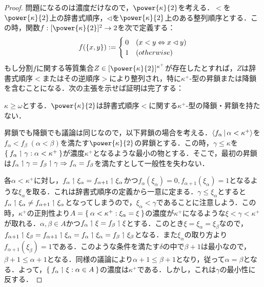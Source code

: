 \documentclass[a4paper]{bxjsarticle}
\begin{document}
\begin{proof}
 問題になるのは濃度だけなので，$\power{\kappa}{2}$を考える．$<$を$\power{\kappa}{2}$上の辞書式順序，$\lhd$を$\power{\kappa}{2}$上のある整列順序とする．この時，関数$f : [\power{\kappa}{2}]^2 \rightarrow 2$を次で定義する：
 \[
  f(\{x, y\}) \mathrel{:=} \begin{cases}
		      0 & (x < y \Leftrightarrow x \lhd y)\\
		      1 & (otherwise)
		     \end{cases}
 \]
 もし分割$f$に関する等質集合$Z \in [\power{\kappa}{2}]^{\kappa^+}$が存在したとすれば，$Z$は辞書式順序$<$またはその逆順序$>$により整列され，特に$\kappa^+$-型の昇鎖または降鎖を含むことになる．次の主張を示せば証明は完了する：

\begin{claim}
 $\kappa \geq \omega$とする．$\power{\kappa}{2}$は辞書式順序$<$に関する$\kappa^+$-型の降鎖・昇鎖を持たない．
\end{claim}
昇鎖でも降鎖でも議論は同じなので，以下昇鎖の場合を考える．$\Braket{f_\alpha | \alpha < \kappa^+}$を$f_\alpha < f_\beta \; (\alpha < \beta)$を満たす$\power{\kappa}{2}$の昇鎖とする．この時，$\gamma \leq \kappa$を$\Set{ f_\alpha \upharpoonleft\gamma : \alpha < \kappa^+}$が濃度$\kappa^+$となるような最小の物とする．そこで，最初の昇鎖は$f_\alpha \upharpoonleft \gamma = f_\beta \upharpoonleft \gamma \Rightarrow f_\alpha = f_\beta$を満たすとして一般性を失わない．

各$\alpha < \kappa^+$に対し，$f_\alpha \upharpoonleft \xi_\alpha = f_{\alpha+1} \upharpoonleft \xi_\alpha$かつ$f_\alpha(\xi_\alpha) = 0, f_{\alpha+1}(\xi_\alpha) = 1$となるような$\xi_\alpha$を取る．これは辞書式順序の定義から一意に定まる．$\gamma \leq \xi_\alpha$とすると$f_\alpha \upharpoonleft \xi_\alpha \neq f_{\alpha+1} \upharpoonleft \xi_\alpha$となってしまうので，$\xi_\alpha < \gamma$であることに注意しよう．この時，$\kappa^+$の正則性より$A = \Set{\alpha < \kappa^+ : \xi_\alpha = \xi}$の濃度が$\kappa^+$になるような$\xi < \gamma < \kappa^+$が取れる．$\alpha, \beta \in A$かつ$f_\alpha \upharpoonleft \xi = f_\beta \upharpoonleft \xi$とする．このとき$\xi = \xi_\alpha = \xi_\beta$なので，$f_{\alpha+1} \upharpoonleft \xi_\beta = f_{\alpha+1} \upharpoonleft \xi_\alpha = f_\alpha \upharpoonleft \xi_\alpha = f_\beta \upharpoonleft \xi_\beta$となる．また$\xi_\alpha$の取り方より$f_{\alpha+1}(\xi_{\beta}) = 1$である．このような条件を満たす$\delta$の中で$\beta+1$は最小なので，$\beta+1 \leq \alpha+1$となる．同様の議論により$\alpha+1\leq\beta+1$となり，従って$\alpha=\beta$となる．よって，$\Set{f_\alpha \upharpoonleft\xi : \alpha \in A}$の濃度は$\kappa^+$である．しかし，これは$\gamma$の最小性に反する．\mbox{}
\end{proof}
\end{document}
